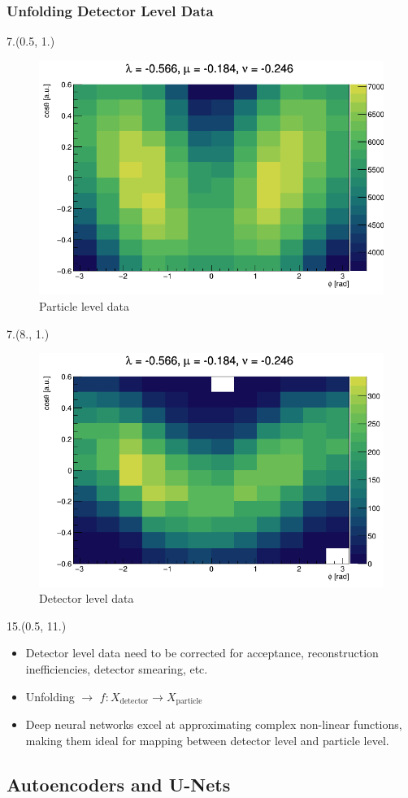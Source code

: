 \documentclass[12pt, xcolor={dvipsnames}, aspectratio = 169, sans, mathserif]{beamer}
\newenvironment{List}[2]
{\begin{textblock}{#1}#2
\begin{itemize}}
{\end{itemize}
\end{textblock}}
\newenvironment{Pic}[2]
{\begin{textblock}{#1}#2
\begin{figure}}
{\end{figure}
\end{textblock}}
\begin{document}
\begin{frame}
\frametitle{Unfolding Detector Level Data}

\begin{Pic}{7.}{(0.5, 1.)}
  \caption{Particle level data}
  \includegraphics[width=7.cm]{imgs/particle_level.png}
\end{Pic}

\begin{Pic}{7.}{(8., 1.)}
  \caption{Detector level data}
  \includegraphics[width=7.cm]{imgs/detector_level.png}
\end{Pic}

\begin{List}{15.}{(0.5, 11.)}

  \item Detector level data need to be corrected for acceptance, reconstruction inefficiencies, detector smearing, etc.

  \item Unfolding $\rightarrow$ $f: X_{\text{detector}} \rightarrow X_{\text{particle}}$

  \item Deep neural networks excel at approximating complex non-linear functions, making them ideal for mapping between detector level and particle level.
\end{List}

\end{frame}

\subsection{Autoencoders and U-Nets}
\end{document}
